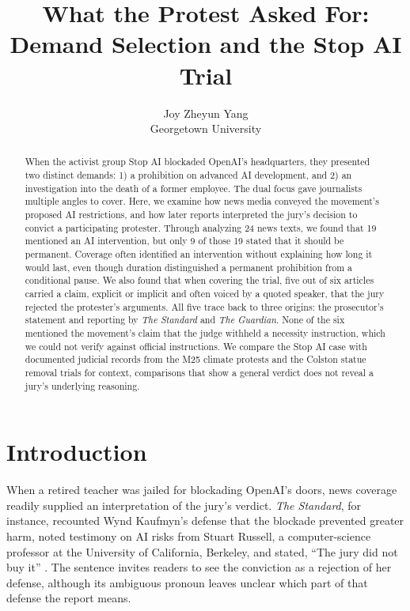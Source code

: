 \documentclass[11pt]{article}
\title{\bfseries What the Protest Asked For:\\Demand Selection and the Stop AI Trial}
\author{Joy Zheyun Yang\\[0.35em]\normalsize Georgetown University}
\date{}
\begin{document}
\maketitle
\begin{abstract}
When the activist group Stop AI blockaded OpenAI's headquarters, they presented two distinct demands: 1) a prohibition on advanced AI development, and 2) an investigation into the death of a former employee. The dual focus gave journalists multiple angles to cover. Here, we examine how news media conveyed the movement's proposed AI restrictions, and how later reports interpreted the jury's decision to convict a participating protester. Through analyzing 24 news texts, we found that 19 mentioned an AI intervention, but only 9 of those 19 stated that it should be permanent. Coverage often identified an intervention without explaining how long it would last, even though duration distinguished a permanent prohibition from a conditional pause. We also found that when covering the trial, five out of six articles carried a claim, explicit or implicit and often voiced by a quoted speaker, that the jury rejected the protester's arguments. All five trace back to three origins: the prosecutor's statement and reporting by \textit{The Standard} and \textit{The Guardian}. None of the six mentioned the movement's claim that the judge withheld a necessity instruction, which we could not verify against official instructions. We compare the Stop AI case with documented judicial records from the M25 climate protests and the Colston statue removal trials for context, comparisons that show a general verdict does not reveal a jury's underlying reasoning.

\end{abstract}

\section{Introduction}
When a retired teacher was jailed for blockading OpenAI's doors, news coverage readily supplied an interpretation of the jury's verdict. \textit{The Standard}, for instance, recounted Wynd Kaufmyn's defense that the blockade prevented greater harm, noted testimony on AI risks from Stuart Russell, a computer-science professor at the University of California, Berkeley, and stated, ``The jury did not buy it'' \citep{shugerman}. The sentence invites readers to see the conviction as a rejection of her defense, although its ambiguous pronoun leaves unclear which part of that defense the report means.
\end{document}
